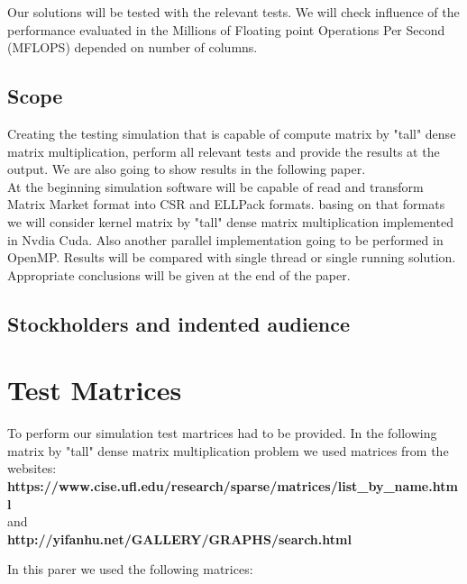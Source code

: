 \documentclass{scrreprt}
\begin{document}
Our solutions will be tested with the relevant tests. We will check influence of the performance evaluated in the Millions of Floating point Operations Per Second (MFLOPS) depended on number of columns. 

\section{Scope}
Creating the testing simulation that is capable of compute matrix by "tall" dense matrix multiplication, perform all relevant tests and provide the results at the output. We are also going to show results in the following paper. 
\\
At the beginning simulation software will be capable of read and transform Matrix Market format into CSR and ELLPack formats. basing on that formats we will consider kernel matrix by "tall" dense matrix multiplication implemented in Nvdia Cuda. Also another parallel implementation going to be performed in OpenMP. Results will be compared with single thread or single running solution.
\\
Appropriate conclusions will be given at the end of the paper.

\section{Stockholders and indented audience}


\chapter{Test Matrices}

To perform our simulation test martrices had to be provided. In the following matrix by "tall" dense matrix multiplication problem we used matrices from the websites: \\
\textbf{https://www.cise.ufl.edu/research/sparse/matrices/list_by_name.html} \\
and \\
\textbf{http://yifanhu.net/GALLERY/GRAPHS/search.html}

In this parer we used the following matrices:




\setlength{\arrayrulewidth}{1mm}
\setlength{\tabcolsep}{12pt}
\renewcommand{\arraystretch}{3}
 
 
\end{document}
